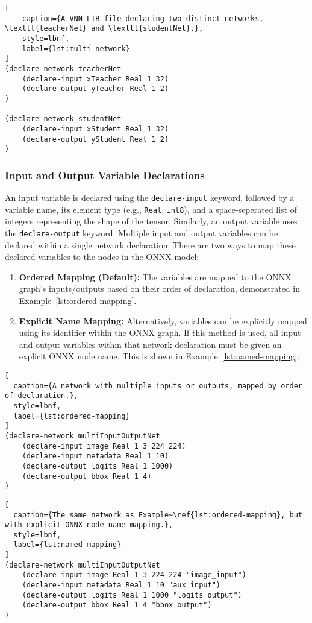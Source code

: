 \begin{lstlisting}[
    caption={A VNN-LIB file declaring two distinct networks, \texttt{teacherNet} and \texttt{studentNet}.},
    style=lbnf,
    label={lst:multi-network}
]
(declare-network teacherNet
    (declare-input xTeacher Real 1 32)
    (declare-output yTeacher Real 1 2)
)

(declare-network studentNet
    (declare-input xStudent Real 1 32)
    (declare-output yStudent Real 1 2)
)
\end{lstlisting}

\subsubsection*{Input and Output Variable Declarations}
\label{sec:input-output-declarations}
An input variable is declared using the \texttt{declare-input} keyword, followed by a variable name, its element type (e.g., \texttt{Real}, \texttt{int8}), 
and a space-seperated list of integers representing the shape of the tensor. Similarly, an output variable uses the \texttt{declare-output} keyword. Multiple 
input and output variables can be declared within a single network declaration. There are two ways to map these declared variables to the nodes in the ONNX model:
\begin{enumerate}
    \item \textbf{Ordered Mapping (Default):} The variables are mapped to the ONNX graph's inputs/outputs based on their order of declaration, demonstrated in Example~\ref{lst:ordered-mapping}. 
    \item \textbf{Explicit Name Mapping:} Alternatively, variables can be explicitly mapped using its identifier within the ONNX graph. If this method is used, all input and output 
        variables within that network declaration must be given an explicit ONNX node name. This is shown in Example~\ref{lst:named-mapping}.
\end{enumerate}

\begin{lstlisting}[
  caption={A network with multiple inputs or outputs, mapped by order of declaration.},
  style=lbnf,
  label={lst:ordered-mapping}
]
(declare-network multiInputOutputNet
    (declare-input image Real 1 3 224 224)
    (declare-input metadata Real 1 10)
    (declare-output logits Real 1 1000)
    (declare-output bbox Real 1 4)
)
\end{lstlisting}

\begin{lstlisting}[
  caption={The same network as Example~\ref{lst:ordered-mapping}, but with explicit ONNX node name mapping.},
  style=lbnf,
  label={lst:named-mapping}
]
(declare-network multiInputOutputNet
    (declare-input image Real 1 3 224 224 "image_input")
    (declare-input metadata Real 1 10 "aux_input")
    (declare-output logits Real 1 1000 "logits_output")
    (declare-output bbox Real 1 4 "bbox_output")
)
\end{lstlisting}

